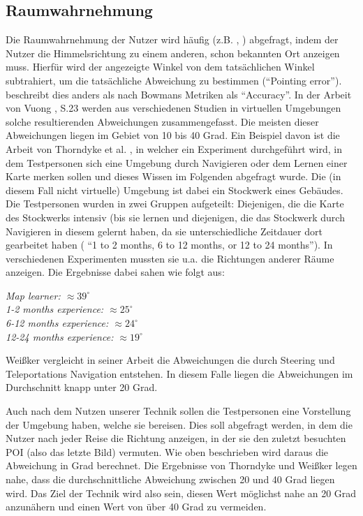 \subsection{Raumwahrnehmung}
Die Raumwahrnehmung der Nutzer wird häufig (z.B. \cite{Kopper2006DesignEnvironments}, \cite{Richardson1999}) abgefragt, indem der Nutzer die Himmelsrichtung zu einem anderen, schon bekannten Ort anzeigen muss. Hierfür wird der angezeigte Winkel von dem tatsächlichen Winkel subtrahiert, um die tatsächliche Abweichung zu bestimmen (“Pointing error”). \cite{Kopper2006DesignEnvironments} beschreibt dies anders als nach Bowmans Metriken als “Accuracy”.
In der Arbeit von Vuong \cite{29_POINTING_ERROR_jennyVuong_small}, S.23 werden aus verschiedenen Studien in virtuellen Umgebungen solche resultierenden Abweichungen zusammengefasst. Die meisten dieser Abweichungen liegen im Gebiet von 10 bis 40 Grad.
Ein Beispiel davon ist die Arbeit von Thorndyke et al. \cite{Thorndyke1980LNAVIGATION}, in welcher ein Experiment durchgeführt wird, in dem Testpersonen sich eine Umgebung durch Navigieren oder dem Lernen einer Karte merken sollen und dieses Wissen im Folgenden abgefragt wurde.
Die (in diesem Fall nicht virtuelle) Umgebung ist dabei ein Stockwerk eines Gebäudes. Die Testpersonen wurden in zwei Gruppen aufgeteilt: Diejenigen, die die Karte des Stockwerks intensiv (bis sie  lernen und diejenigen, die das Stockwerk durch Navigieren in diesem gelernt haben, da sie unterschiedliche Zeitdauer dort gearbeitet haben ( “1 to 2 months, 6 to 12 months, or 12 to 24 months”).
In verschiedenen Experimenten mussten sie u.a. die Richtungen anderer Räume anzeigen.
Die Ergebnisse dabei sahen wie folgt aus: 
\begin{addmargin}[25pt]{0pt} 

\textit{Map learner: $\approx 39 ^\circ$ \\
1-2 months experience: $\approx  25 ^\circ$ \\
6-12 months experience: $\approx  24 ^\circ$ \\
12-24 months experience: $\approx  19 ^\circ$ \\}
\end{addmargin}

Weißker \cite{Weibker2018SpatialEnvironments} vergleicht in seiner Arbeit die Abweichungen die durch Steering und Teleportations Navigation entstehen. In diesem Falle liegen die Abweichungen im Durchschnitt knapp unter 20 Grad.

Auch nach dem Nutzen unserer Technik sollen die Testpersonen eine Vorstellung der Umgebung haben, welche sie bereisen. Dies soll abgefragt werden, in dem die Nutzer nach jeder Reise die Richtung anzeigen, in der sie den zuletzt besuchten POI (also das letzte Bild) vermuten. Wie oben beschrieben wird daraus die Abweichung in Grad berechnet. 
Die Ergebnisse von Thorndyke und Weißker legen nahe, dass die durchschnittliche Abweichung zwischen 20 und 40 Grad liegen wird. Das Ziel der Technik wird also sein, diesen Wert möglichst nahe an 20 Grad anzunähern und einen Wert von über 40 Grad zu vermeiden.

